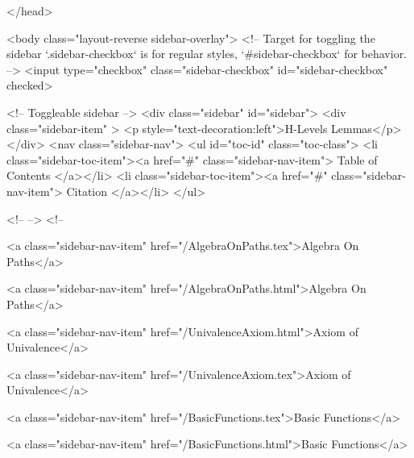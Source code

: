   
</head>




  <body class="layout-reverse sidebar-overlay">
    <!-- Target for toggling the sidebar `.sidebar-checkbox` is for regular
     styles, `#sidebar-checkbox` for behavior. -->
<input type="checkbox" class="sidebar-checkbox" id="sidebar-checkbox" checked>

<!-- Toggleable sidebar -->
<div class="sidebar" id="sidebar">
  <div class="sidebar-item" >
    <p style="text-decoration:left">H-Levels Lemmas</p>
  </div>
  <nav class="sidebar-nav">
    <ul id="toc-id" class="toc-class">
  <li class="sidebar-toc-item"><a href="#" class="sidebar-nav-item"> Table of Contents </a></li>
  <li class="sidebar-toc-item"><a href="#" class="sidebar-nav-item"> Citation </a></li>
</ul>


    <!--  -->
    <!-- 
      
    
      
    
      
    
      
        
      
    
      
        
          <a class="sidebar-nav-item" href="/AlgebraOnPaths.tex">Algebra On Paths</a>
        
      
    
      
        
          <a class="sidebar-nav-item" href="/AlgebraOnPaths.html">Algebra On Paths</a>
        
      
    
      
        
          <a class="sidebar-nav-item" href="/UnivalenceAxiom.html">Axiom of Univalence</a>
        
      
    
      
        
          <a class="sidebar-nav-item" href="/UnivalenceAxiom.tex">Axiom of Univalence</a>
        
      
    
      
        
          <a class="sidebar-nav-item" href="/BasicFunctions.tex">Basic Functions</a>
        
      
    
      
        
          <a class="sidebar-nav-item" href="/BasicFunctions.html">Basic Functions</a>
        
      
    
